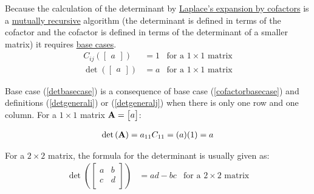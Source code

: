 \documentclass{article}%
\begin{document}
\begin{multicols}{2}
Because the calculation of the determinant by \href{http://en.wikipedia.org/wiki/Laplace_expansion}{Laplace's expansion by cofactors} is a \href{https://en.wikipedia.org/wiki/Mutual_recursion}{mutually recursive} algorithm (the determinant is defined in terms of the cofactor and the cofactor is defined in terms of the determinant of a smaller matrix) it requires \href{https://en.wikipedia.org/wiki/Recursion_(computer_science)\#Recursive_functions_and_algorithms}{base cases}.
\begin{align}
C_{ij}\left( \begin{bmatrix} a \end{bmatrix} \right) &= 1 &\text{for a $1 \times 1$ matrix} \label{cofactorbasecase} \\
\det\left( \begin{bmatrix} a \end{bmatrix} \right) &= a &\text{for a $1 \times 1$ matrix} \label{detbasecase}
\end{align}

Base case (\ref{detbasecase}) is a consequence of base case (\ref{cofactorbasecase}) and definitions (\ref{detgenerali}) or (\ref{detgeneralj}) when there is only one row and one column. For a $1 \times 1$ matrix $\mathbf{A} = \begin{bmatrix} a \end{bmatrix}$:

\begin{align}
 \det\left( \mathbf{A} \right) =  a_{11} C_{11} = (a) (1)  = a
\end{align}

For a $2 \times 2$ matrix, the formula for the determinant is usually given as:
\begin{align}
\det\left(  \begin{bmatrix} a & b\\ c & d\\ \end{bmatrix} \right) &= ad - bc &\text{for a $2 \times 2$ matrix} \label{dettwoxtwo}
\end{align}


\end{multicols}
\end{document}
